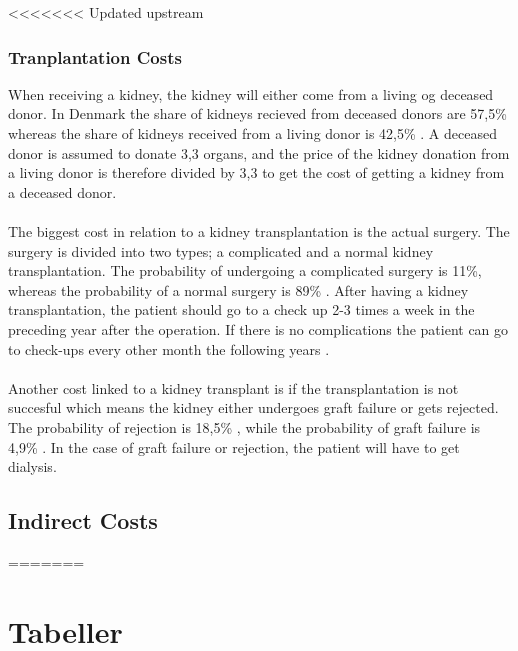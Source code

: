 \documentclass[a4paper,12pt]{article}
\begin{document}
<<<<<<< Updated upstream
\subsubsection*{Tranplantation Costs}

When receiving a kidney, the kidney will either come from a living og deceased donor. In Denmark the share of kidneys recieved from deceased donors are 57,5\% whereas the share of kidneys received from a living donor is  42,5\% \cite{DNSL}. A deceased donor is assumed to donate 3,3 organs, and the price of the kidney donation from a living donor  is therefore divided by 3,3 to get the cost of getting a kidney from a deceased donor. 
\\\\
The biggest cost in relation to a kidney  transplantation is the actual surgery. The surgery is divided into two types; a complicated and a normal kidney transplantation. The probability of undergoing a complicated surgery is 11\%, whereas the probability of a normal surgery is 89\% \cite{esundhed} \cite{CUAdkartikel}. After having a kidney transplantation, the patient should go to a check up 2-3 times a week in the preceding year after the operation. If there is no complications the patient can go to check-ups every other month the following years \cite{Rigshospitalet}. 
\\\\
Another cost linked to a kidney transplant is if the transplantation is not succesful which means the kidney either undergoes graft failure or gets rejected. The probability of rejection is 18,5\% \cite{Rigshospitalet}, while the probability of graft failure is 4,9\% \cite{DNSL}. In the case of graft failure or rejection, the patient will have to get dialysis.

\subsection{Indirect Costs}
=======





\section{Tabeller}
\end{document}
